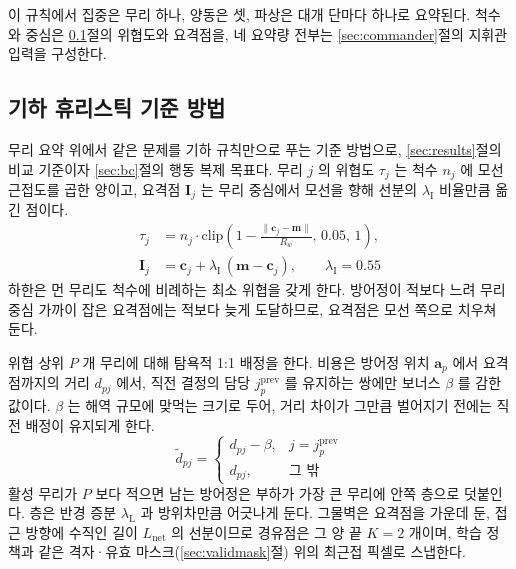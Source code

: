 이 규칙에서 집중은 무리 하나, 양동은 셋, 파상은 대개 단마다 하나로 요약된다. 척수와 중심은
\ref{sec:heuristic}절의 위협도와 요격점을, 네 요약량 전부는 \ref{sec:commander}절의
지휘관 입력을 구성한다.

\subsection{기하 휴리스틱 기준 방법}
\label{sec:heuristic}

무리 요약 위에서 같은 문제를 기하 규칙만으로 푸는 기준 방법으로, \ref{sec:results}절의 비교
기준이자 \ref{sec:bc}절의 행동 복제 목표다. 무리 $j$ 의 위협도 $\tau_j$ 는 척수 $n_j$ 에 모선
근접도를 곱한 양이고, 요격점 $\mathbf{I}_j$ 는 무리 중심에서 모선을 향해 선분의 $\lambda_{\mathrm{I}}$
비율만큼 옮긴 점이다.
\begin{equation}
\begin{aligned}
\tau_j &= n_j \cdot \mathrm{clip}\!\left(1 - \frac{\lVert \mathbf{c}_j - \mathbf{m}\rVert}{R_w},
         \, 0.05,\, 1\right),\\
\mathbf{I}_j &= \mathbf{c}_j + \lambda_{\mathrm{I}}\,(\mathbf{m} - \mathbf{c}_j), \qquad \lambda_{\mathrm{I}} = 0.55
\end{aligned}
\label{eq:threat}
\end{equation}
하한은 먼 무리도 척수에 비례하는 최소 위협을 갖게 한다. 방어정이 적보다 느려 무리 중심
가까이 잡은 요격점에는 적보다 늦게 도달하므로, 요격점은 모선 쪽으로 치우쳐 둔다.

위협 상위 $P$ 개 무리에 대해 탐욕적 1:1 배정을 한다. 비용은 방어정 위치 $\mathbf{a}_p$ 에서
요격점까지의 거리 $d_{pj}$ 에서, 직전 결정의 담당 $j_p^{\text{prev}}$ 를 유지하는 쌍에만
보너스 $\beta$ 를 감한 값이다. $\beta$ 는 해역 규모에 맞먹는 크기로 두어, 거리 차이가
그만큼 벌어지기 전에는 직전 배정이 유지되게 한다.
\begin{equation}
\tilde{d}_{pj} = \begin{cases}
  d_{pj} - \beta, & j = j_p^{\text{prev}}\\
  d_{pj},          & \text{그 밖}
\end{cases}
\label{eq:sticky}
\end{equation}
활성 무리가 $P$ 보다 적으면 남는 방어정은 부하가 가장 큰 무리에 안쪽 층으로 덧붙인다. 층은 반경 증분 $\lambda_{\mathrm{L}}$ 과 방위차만큼 어긋나게 둔다. 그물벽은 요격점을 가운데 둔, 접근 방향에 수직인
길이 $L_{\mathrm{net}}$ 의 선분이므로 경유점은 그 양 끝 $K = 2$ 개이며, 학습 정책과 같은
격자·유효 마스크(\ref{sec:validmask}절) 위의 최근접 픽셀로 스냅한다.

